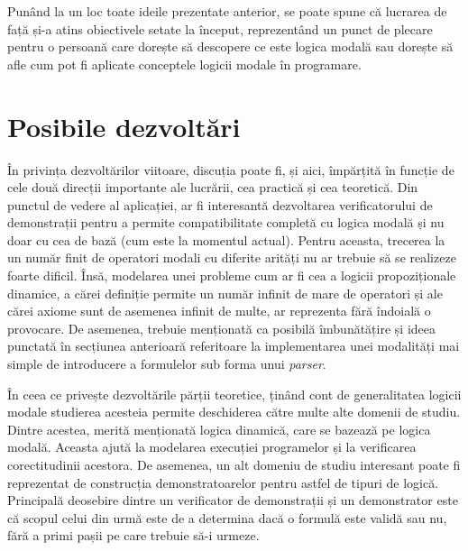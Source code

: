 \documentclass[12pt, openany]{book}
\begin{document}
            \par{}
                Punând la un loc toate ideile prezentate anterior, se poate spune că lucrarea de față și-a atins 
                obiectivele setate la început, reprezentând un punct de plecare pentru o persoană care dorește să 
                descopere ce este logica modală sau dorește să afle cum pot fi aplicate conceptele logicii modale în 
                programare.

        \section{Posibile dezvoltări} %
        \label{section_future_work}
            \par{}
                În privința dezvoltărilor viitoare, discuția poate fi, și aici, împărțită în funcție de cele două 
                direcții importante ale lucrării, cea practică și cea teoretică. Din punctul de vedere al aplicației, ar 
                fi interesantă dezvoltarea verificatorului de demonstrații pentru a permite compatibilitate completă cu 
                logica modală și nu doar cu cea de bază (cum este la momentul actual). Pentru aceasta, trecerea la un 
                număr finit de operatori modali cu diferite arități nu ar trebuie să se realizeze foarte dificil. Însă, 
                modelarea unei probleme cum ar fi cea a logicii propoziționale dinamice, a cărei definiție permite un 
                număr infinit de mare de operatori și ale cărei axiome sunt de asemenea infinit de multe, ar reprezenta 
                fără îndoială o provocare. De asemenea, trebuie menționată ca posibilă îmbunătățire și ideea punctată în
                secțiunea anterioară referitoare la implementarea unei modalități mai simple de introducere a 
                formulelor sub forma unui \textit{parser}.

            \par{}
                În ceea ce privește dezvoltările părții teoretice, ținând cont de generalitatea logicii modale studierea 
                acesteia permite deschiderea către multe alte domenii de studiu. Dintre acestea, merită menționată 
                logica dinamică, care se bazează pe logica modală. Aceasta ajută la modelarea execuției programelor și 
                la verificarea corectitudinii acestora. De asemenea, un alt domeniu de studiu interesant poate fi 
                reprezentat de construcția demonstratoarelor pentru astfel de tipuri de logică. Principală deosebire 
                dintre un verificator de demonstrații și un demonstrator este că scopul celui din urmă este de a 
                determina dacă o formulă este validă sau nu, fără a primi pașii pe care trebuie să-i urmeze.

    
\end{document}
